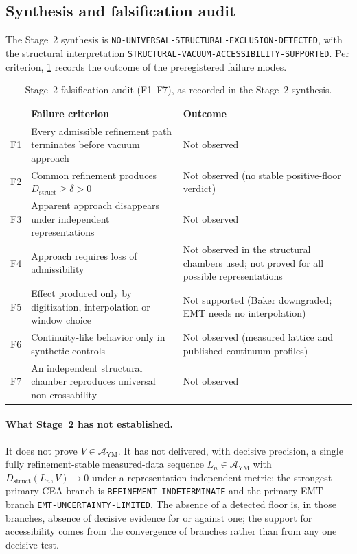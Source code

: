 \documentclass[11pt,a4paper]{article}
\theoremstyle{definition}
\theoremstyle{remark}
\newcommand{\Dstruct}{D_{\mathrm{struct}}}
\newcommand{\AYM}{\mathcal{A}_{\mathrm{YM}}}
\begin{document}
\subsection{Synthesis and falsification audit}
The Stage~2 synthesis is \texttt{NO-\allowbreak{}UNIVERSAL-\allowbreak{}STRUCTURAL-\allowbreak{}EXCLUSION-\allowbreak{}DETECTED}, with the structural interpretation \texttt{STRUCTURAL-\allowbreak{}VACUUM-\allowbreak{}ACCESSIBILITY-\allowbreak{}SUPPORTED}. Per criterion, \cref{tab:F} records the outcome of the preregistered failure modes.

\begin{table}[t]
\centering\small
\caption{Stage~2 falsification audit (F1--F7), as recorded in the Stage~2 synthesis.}\label{tab:F}
\begin{tabularx}{\textwidth}{@{}l>{\raggedright\arraybackslash}X>{\raggedright\arraybackslash}p{4.2cm}@{}}
\toprule
& Failure criterion & Outcome\\\midrule
F1 & Every admissible refinement path terminates before vacuum approach & Not observed\\
F2 & Common refinement produces $\Dstruct\ge\delta>0$ & Not observed (no stable positive-floor verdict)\\
F3 & Apparent approach disappears under independent representations & Not observed\\
F4 & Approach requires loss of admissibility & Not observed in the structural chambers used; not proved for all possible representations\\
F5 & Effect produced only by digitization, interpolation or window choice & Not supported (Baker downgraded; EMT needs no interpolation)\\
F6 & Continuity-like behavior only in synthetic controls & Not observed (measured lattice and published continuum profiles)\\
F7 & An independent structural chamber reproduces universal non-crossability & Not observed\\\bottomrule
\end{tabularx}
\end{table}

\paragraph{What Stage~2 has not established.} It does not prove $V\in\overline{\AYM}$. It has not delivered, with decisive precision, a single fully refinement-stable measured-data sequence $L_n\in\AYM$ with $\Dstruct(L_n,V)\to0$ under a representation-independent metric: the strongest primary CEA branch is \texttt{REFINEMENT-\allowbreak{}INDETERMINATE} and the primary EMT branch \texttt{EMT-\allowbreak{}UNCERTAINTY-\allowbreak{}LIMITED}. The absence of a detected floor is, in those branches, absence of decisive evidence for or against one; the support for accessibility comes from the convergence of branches rather than from any one decisive test.
\end{document}
